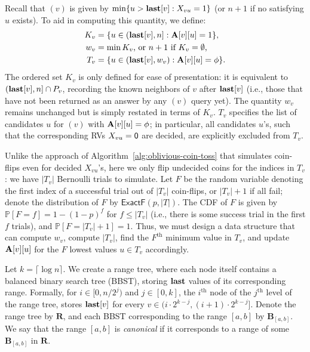 Recall that $(v)$ is given by $\min\{u > \mathbf{last}[v]: X_{vu} = 1\}$ (or $n+1$ if no satisfying $u$ exists). To aid in computing this quantity, we define:
\begin{align*}
K_v &= \{u \in (\mathbf{last}[v], n]: \mathbf{A}[v][u]=1\},\\
w_v &= \min K_v \textrm{, or $n+1$ if $K_v = \emptyset$,} \\
T_v &= \{u \in (\mathbf{last}[v], w_v): \mathbf{A}[v][u] = \phi\}.
\end{align*}
The ordered set $K_v$ is only defined for ease of presentation: it is equivalent to $(\mathbf{last}[v],n] \cap P_v$, recording the known neighbors of $v$ after $\mathbf{last}[v]$ (i.e., those that have not been returned as an answer by any $(v)$ query yet). The quantity $w_v$ remains unchanged but is simply restated in terms of $K_v$. $T_v$ specifies the list of candidates $u$ for $(v)$ with $\mathbf{A}[v][u] = \phi$; in particular, all candidates $u$'s, such that the corresponding RVs $X_{vu} = \mathsf{0}$ are decided, are explicitly excluded from $T_v$.

Unlike the approach of Algorithm~\ref{alg:oblivious-coin-toss} that simulates coin-flips even for decided $X_{vu}$'s, here we only flip undecided coins for the indices in $T_v$: we have $|T_v|$ Bernoulli trials to simulate. Let $F$ be the random variable denoting the first index of a successful trial out of $|T_v|$ coin-flips, or $|T_v|+1$ if all fail; denote the distribution of $F$ by $\mathsf{ExactF}(p,|T|)$. The CDF of $F$ is given by $\mathbb P[F = f] = 1-(1-p)^f$ for $f \leq |T_v|$ (i.e., there is some success trial in the first $f$ trials), and $\mathbb P[F = |T_v|+1] = 1$. Thus, we must design a data structure that can compute $w_v$, compute $|T_v|$, find the $F^\textrm{th}$ minimum value in $T_v$, and update $\mathbf{A}[v][u]$ for the $F$ lowest values $u \in T_v$ accordingly.

Let $k = \lceil \log n \rceil$. We create a range tree, where each node itself contains a balanced binary search tree (BBST), storing $\mathbf{last}$ values of its corresponding range. Formally, for $i \in [0, n/2^j)$ and $j \in [0, k]$, the $i^\textrm{th}$ node of the $j^\textrm{th}$ level of the range tree, stores $\mathbf{last}[v]$ for every $v \in (i \cdot 2^{k-j}, (i+1)\cdot 2^{k-j}]$. Denote the range tree by $\mathbf{R}$, and each BBST corresponding to the range $[a, b]$ by $\mathbf{B}_{[a,b]}$. We say that the range $[a,b]$  is \emph{canonical} if it corresponds to a range of some $\mathbf{B}_{[a,b]}$ in $\mathbf{R}$.

